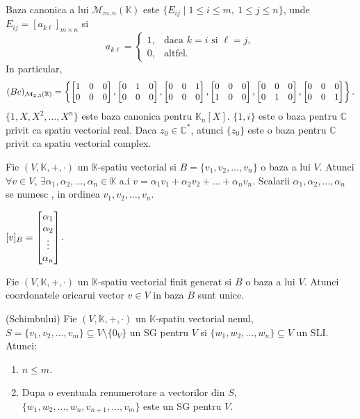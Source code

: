 \documentclass{article}
\begin{document}
\begin{enumerate}
  \exemplu Baza canonica a lui $\mathcal{M}_{m, n}(\mathbb{K})$ este $\{E_{ij} \mid 1 \leq i \leq m,\ 1 \leq j \leq n\}$, unde $E_{ij} = [a_{k\ell}]_{m \times n}$ si
  \[
    a_{k\ell} =
    \begin{cases}
      1, & \text{daca } k = i \text{ si } \ell = j, \\
      0, & \text{altfel}.
    \end{cases}
  \]
  In particular,
  \[
    (Bc)_{\mathcal{M}_{2, 3}(\mathbb{R})} =
    \left\{
      \begin{bmatrix}1 & 0 & 0 \\ 0 & 0 & 0\end{bmatrix},
      \begin{bmatrix}0 & 1 & 0 \\ 0 & 0 & 0\end{bmatrix},
      \begin{bmatrix}0 & 0 & 1 \\ 0 & 0 & 0\end{bmatrix},
      \begin{bmatrix}0 & 0 & 0 \\ 1 & 0 & 0\end{bmatrix},
      \begin{bmatrix}0 & 0 & 0 \\ 0 & 1 & 0\end{bmatrix},
      \begin{bmatrix}0 & 0 & 0 \\ 0 & 0 & 1\end{bmatrix}
    \right\}.
  \]
  \exemplu $\{1, X, X^2, \dots, X^n\}$ este baza canonica pentru $\mathbb{K}_n[X]$.
  \exemplu $\{1, i\}$ este o baza pentru $\mathbb{C}$ privit ca spatiu vectorial real.
  \exemplu Daca $z_0 \in \mathbb{C}^*$, atunci $\{z_0\}$ este o baza pentru $\mathbb{C}$ privit ca spatiu vectorial complex.

   Fie $(V, \mathbb{K}, +, \cdot)$ un $\mathbb{K}$-spatiu vectorial si $B = \{v_1, v_2, \dots, v_n\}$ o baza a lui $V$. Atunci $\forall v \in V$, $\exists \alpha_1, \alpha_2, \dots, \alpha_n \in \mathbb{K}$ a.i $v = \alpha_1 v_1 + \alpha_2 v_2 + \dots + \alpha_n v_n$. Scalarii $\alpha_1, \alpha_2, \dots, \alpha_n$ se numesc , in ordinea $v_1, v_2, \dots, v_n$.

  \notatie $[v]_B = \begin{bmatrix}\alpha_1 \\ \alpha_2 \\ \vdots \\ \alpha_n\end{bmatrix}$.

  \proprietate Fie $(V, \mathbb{K}, +, \cdot)$ un $\mathbb{K}$-spatiu vectorial finit generat si $B$ o baza a lui $V$. Atunci coordonatele oricarui vector $v \in V$ in baza $B$ sunt unice.

  \lema (Schimbului) Fie $(V, \mathbb{K}, +, \cdot)$ un $\mathbb{K}$-spatiu vectorial nenul, $S = \{v_1, v_2, \dots, v_m\} \subseteq V \setminus \{0_V\}$ un SG pentru $V$ si $\{w_1, w_2, \dots, w_n\} \subseteq V$ un SLI. Atunci:
  \begin{enumerate}
    \item $n \leq m$.
    \item Dupa o eventuala renumerotare a vectorilor din $S$, $\{w_1, w_2, \dots, w_n, v_{n+1}, \dots, v_m\}$ este un SG pentru $V$.
  \end{enumerate}


\end{enumerate}
\end{document}
